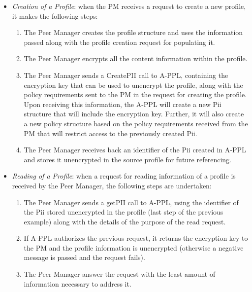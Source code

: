 \begin{itemize}
	\item \emph{Creation of a Profile}: when the PM receives a request to create a new profile, it makes the following steps:
	\begin{enumerate}
		\item The Peer Manager creates the profile structure and uses the information passed along with the profile creation request for populating it.
		\item The Peer Manager encrypts all the content information within the profile. %
		\item The Peer Manager sends a CreatePII call to A-PPL, containing the encryption key that can be used to unencrypt the profile, along with the policy requirements sent to the PM in the request for creating the profile. Upon receiving this information, the A-PPL will create a new Pii structure that will include the encryption key. Further, it will also create a new policy structure based on the policy requirements received from the PM that will restrict access to the previously created Pii.
		\item The Peer Manager receives back an identifier of the Pii created in A-PPL and stores it unencrypted in the source profile for future referencing.
	\end{enumerate}
	\item \emph{Reading of a Profile}: when a request for reading information of a profile is received by the Peer Manager, the following steps are undertaken:
	\begin{enumerate}
		\item The Peer Manager sends a getPII call to A-PPL, using the identifier of the Pii stored unencrypted in the profile (last step of the previous example) along with the details of the purpose of the read request.
		\item If A-PPL authorizes the previous request, it returns the encryption key to the PM and the profile information is unencrypted (otherwise a negative message is passed and the request fails).
		\item The Peer Manager answer the request with the least amount of information necessary to address it.
	\end{enumerate}
\end{itemize}